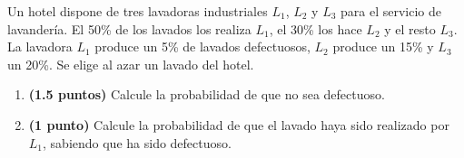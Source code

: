 
Un hotel dispone de tres lavadoras industriales $L_1$, $L_2$ y $L_3$ para el servicio de lavandería. El 50\% de los lavados los realiza $L_1$, el 30\% los hace $L_2$ y el resto $L_3$. La lavadora $L_1$ produce un 5\% de lavados defectuosos, $L_2$ produce un 15\% y $L_3$ un 20\%. Se elige al azar un lavado del hotel.
\begin{enumerate}[label=\alph*)]
\item \textbf{(1.5 puntos)} Calcule la probabilidad de que no sea defectuoso.
\item \textbf{(1 punto)} Calcule la probabilidad de que el lavado haya sido realizado por $L_1$, sabiendo que ha sido defectuoso.
\end{enumerate}
